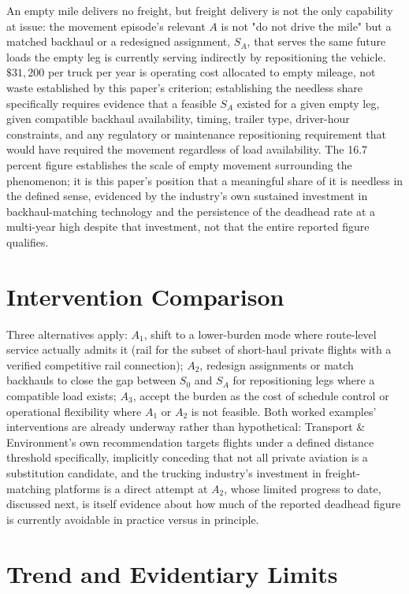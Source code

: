 \documentclass[11pt]{article}
\begin{document}
An empty mile delivers no freight, but freight delivery is not the only capability at issue: the movement episode's relevant $A$ is not "do not drive the mile" but a matched backhaul or a redesigned assignment, $S_A$, that serves the same future loads the empty leg is currently serving indirectly by repositioning the vehicle. $\$31{,}200$ per truck per year is operating cost allocated to empty mileage, not waste established by this paper's criterion; establishing the needless share specifically requires evidence that a feasible $S_A$ existed for a given empty leg, given compatible backhaul availability, timing, trailer type, driver-hour constraints, and any regulatory or maintenance repositioning requirement that would have required the movement regardless of load availability. The 16.7 percent figure establishes the scale of empty movement surrounding the phenomenon; it is this paper's position that a meaningful share of it is needless in the defined sense, evidenced by the industry's own sustained investment in backhaul-matching technology and the persistence of the deadhead rate at a multi-year high despite that investment, not that the entire reported figure qualifies.

\section{Intervention Comparison}

Three alternatives apply: $A_1$, shift to a lower-burden mode where route-level service actually admits it (rail for the subset of short-haul private flights with a verified competitive rail connection); $A_2$, redesign assignments or match backhauls to close the gap between $S_0$ and $S_A$ for repositioning legs where a compatible load exists; $A_3$, accept the burden as the cost of schedule control or operational flexibility where $A_1$ or $A_2$ is not feasible. Both worked examples' interventions are already underway rather than hypothetical: Transport \& Environment's own recommendation targets flights under a defined distance threshold specifically, implicitly conceding that not all private aviation is a substitution candidate, and the trucking industry's investment in freight-matching platforms is a direct attempt at $A_2$, whose limited progress to date, discussed next, is itself evidence about how much of the reported deadhead figure is currently avoidable in practice versus in principle.

\section{Trend and Evidentiary Limits}
\end{document}
